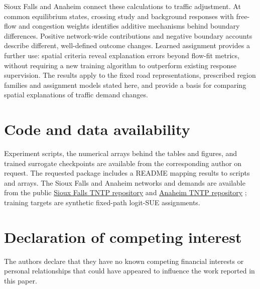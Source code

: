 \documentclass[a4paper,fleqn]{cas-sc}
\begin{document}
Sioux Falls and Anaheim connect these calculations to traffic adjustment.
At common equilibrium states, crossing study and background responses with
free-flow and congestion weights identifies additive mechanisms behind
boundary differences. Positive network-wide contributions and negative
boundary accounts describe different, well-defined outcome changes. Learned
assignment provides a further use: spatial criteria reveal explanation
errors beyond flow-fit metrics, without requiring a new training algorithm
to outperform existing response supervision. The results apply to the fixed
road representations, prescribed region families and assignment models
stated here, and provide a basis for comparing spatial explanations of
traffic demand changes.

\section*{Code and data availability}
Experiment scripts, the numerical arrays behind the tables and figures,
and trained surrogate checkpoints are available from the corresponding
author on request. The requested package includes a README mapping
results to scripts and arrays.
The Sioux Falls and Anaheim networks and demands are available from the public
\href{https://github.com/bstabler/TransportationNetworks/tree/master/SiouxFalls}{Sioux Falls TNTP repository}
and \href{https://github.com/bstabler/TransportationNetworks/tree/master/Anaheim}{Anaheim TNTP repository}
\citep{tnfrc2024transportation}; training targets are synthetic fixed-path
logit-SUE assignments.
\section*{Declaration of competing interest}
The authors declare that they have no known competing financial interests
or personal relationships that could have appeared to influence the work
reported in this paper.
\FloatBarrier

\setlength{\bibsep}{0.8pt plus 0.2pt}

\appendix
{}



\end{document}

